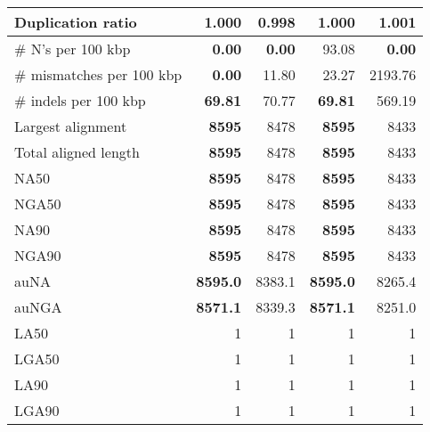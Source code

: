 \documentclass[12pt,a4paper]{article}
\begin{document}
\begin{table}[ht]
\begin{center}
\begin{tabular}{|l*{4}{|r}|}
Duplication ratio & 1.000 & {\bf 0.998} & 1.000 & 1.001 \\ \hline
\# N's per 100 kbp & {\bf 0.00} & {\bf 0.00} & 93.08 & {\bf 0.00} \\ \hline
\# mismatches per 100 kbp & {\bf 0.00} & 11.80 & 23.27 & 2193.76 \\ \hline
\# indels per 100 kbp & {\bf 69.81} & 70.77 & {\bf 69.81} & 569.19 \\ \hline
Largest alignment & {\bf 8595} & 8478 & {\bf 8595} & 8433 \\ \hline
Total aligned length & {\bf 8595} & 8478 & {\bf 8595} & 8433 \\ \hline
NA50 & {\bf 8595} & 8478 & {\bf 8595} & 8433 \\ \hline
NGA50 & {\bf 8595} & 8478 & {\bf 8595} & 8433 \\ \hline
NA90 & {\bf 8595} & 8478 & {\bf 8595} & 8433 \\ \hline
NGA90 & {\bf 8595} & 8478 & {\bf 8595} & 8433 \\ \hline
auNA & {\bf 8595.0} & 8383.1 & {\bf 8595.0} & 8265.4 \\ \hline
auNGA & {\bf 8571.1} & 8339.3 & {\bf 8571.1} & 8251.0 \\ \hline
LA50 & 1 & 1 & 1 & 1 \\ \hline
LGA50 & 1 & 1 & 1 & 1 \\ \hline
LA90 & 1 & 1 & 1 & 1 \\ \hline
LGA90 & 1 & 1 & 1 & 1 \\ \hline
\end{tabular}
\end{center}
\end{table}
\end{document}
